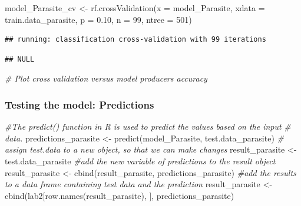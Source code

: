 \documentclass[
]{article}
\newenvironment{Shaded}{\begin{snugshade}}{\end{snugshade}}
\newcommand{\AttributeTok}[1]{\textcolor[rgb]{0.77,0.63,0.00}{#1}}
\newcommand{\CommentTok}[1]{\textcolor[rgb]{0.56,0.35,0.01}{\textit{#1}}}
\newcommand{\DecValTok}[1]{\textcolor[rgb]{0.00,0.00,0.81}{#1}}
\newcommand{\FloatTok}[1]{\textcolor[rgb]{0.00,0.00,0.81}{#1}}
\newcommand{\FunctionTok}[1]{\textcolor[rgb]{0.00,0.00,0.00}{#1}}
\newcommand{\NormalTok}[1]{#1}
\newcommand{\OtherTok}[1]{\textcolor[rgb]{0.56,0.35,0.01}{#1}}
\newcommand{\SpecialCharTok}[1]{\textcolor[rgb]{0.00,0.00,0.00}{#1}}
\begin{document}
\begin{Shaded}
\begin{Highlighting}[]
\NormalTok{model\_Parasite\_cv }\OtherTok{\textless{}{-}} \FunctionTok{rf.crossValidation}\NormalTok{(}\AttributeTok{x =}\NormalTok{ model\_Parasite, }\AttributeTok{xdata =}  
\NormalTok{                                          train.data\_parasite, }
                                    \AttributeTok{p =} \FloatTok{0.10}\NormalTok{, }\AttributeTok{n =} \DecValTok{99}\NormalTok{, }\AttributeTok{ntree =} \DecValTok{501}\NormalTok{)}
\end{Highlighting}
\end{Shaded}

\begin{verbatim}
## running: classification cross-validation with 99 iterations
\end{verbatim}

\begin{Shaded}
\end{Shaded}

\begin{verbatim}
## NULL
\end{verbatim}

\begin{Shaded}
\begin{Highlighting}[]
\CommentTok{\# Plot cross validation versus model producers accuracy}
\end{Highlighting}
\end{Shaded}

\hypertarget{testing-the-model-predictions}{%
\subsubsection{Testing the model:
Predictions}\label{testing-the-model-predictions}}

\begin{Shaded}
\begin{Highlighting}[]
\CommentTok{\#The predict() function in R is used to predict the values based on the input }
\CommentTok{\# data.}
\NormalTok{predictions\_parasite }\OtherTok{\textless{}{-}} \FunctionTok{predict}\NormalTok{(model\_Parasite, test.data\_parasite)}
\CommentTok{\# assign test.data to a new object, so that we can make changes}
\NormalTok{result\_parasite }\OtherTok{\textless{}{-}}\NormalTok{ test.data\_parasite}
\CommentTok{\#add the new variable of predictions to the result object}
\NormalTok{result\_parasite }\OtherTok{\textless{}{-}} \FunctionTok{cbind}\NormalTok{(result\_parasite, predictions\_parasite)}
\CommentTok{\#add the results to a data frame containing test data and the prediction}
\NormalTok{result\_parasite }\OtherTok{\textless{}{-}} \FunctionTok{cbind}\NormalTok{(lab2[}\FunctionTok{row.names}\NormalTok{(result\_parasite), ], predictions\_parasite)}
\end{Highlighting}
\end{Shaded}
\end{document}

